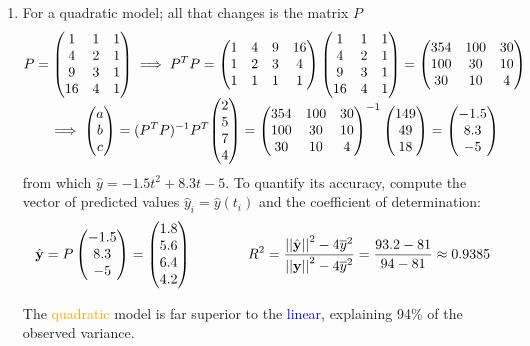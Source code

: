 \begin{example}{}{}
\begin{enumerate}
		\item For a quadratic model; all that changes is the matrix $P$%
		\begin{gather*}
			P=
			\begin{pmatrix}
				1&1&1\\
				4&2&1\\
				9&3&1\\
				16&4&1
			\end{pmatrix}
			\implies P^TP=
			\begin{pmatrix}
				1&4&9&16\\
				1&2&3&4\\
				1&1&1&1
			\end{pmatrix}
			\begin{pmatrix}
				1&1&1\\
				4&2&1\\
				9&3&1\\
				16&4&1
			\end{pmatrix}
			=
			\begin{pmatrix}
				354&100&30\\
				100&30&10\\
				30&10&4
			\end{pmatrix}\\
			\implies \begin{pmatrix}a\\b\\c\end{pmatrix}=(P^TP)^{-1}P^T\smash[t]{\begin{pmatrix}2\\5\\7\\4\end{pmatrix}}=
			\begin{pmatrix}
				354&100&30\\
				100&30&10\\
				30&10&4
			\end{pmatrix}^{-1}
			\begin{pmatrix}149\\49\\18\end{pmatrix}=\begin{pmatrix}-1.5\\8.3\\-5\end{pmatrix}
		\end{gather*}
		from which $\hat y=-1.5t^2+8.3t-5$. To quantify its accuracy, compute the vector of predicted values $\hat y_i=\hat y(t_i)$ and the coefficient of determination:
		\begin{gather*}
			\hat{{\mathbf{y}}}=P\begin{pmatrix}-1.5\\8.3\\-5\end{pmatrix}=\begin{pmatrix}1.8\\5.6\\6.4\\4.2\end{pmatrix}\qquad\qquad
			R^2=\frac{\left| \left| \hat{{\mathbf{y}}}\right|\right|^2-4\overline{y}^2}{\left| \left| {\mathbf{y}}\right|\right|^2-4\overline{y}^2}=\frac{93.2-81}{94-81} \approx 0.9385
		\end{gather*}\par
		
		\begin{minipage}[t]{0.58\linewidth}\vspace{-5pt}
			The \textcolor{orange}{quadratic} model is far superior to the \textcolor{blue}{linear}, explaining 94\% of the observed variance.
			

\end{minipage}
\end{enumerate}
\end{example}

